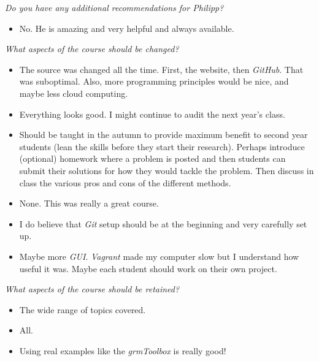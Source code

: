 \begin{boenumerate}
\item \textit{Do you have any additional recommendations for Philipp?}
\begin{itemize}
\item No. He is amazing and very helpful and always available.
\end{itemize}
\item \textit{What aspects of the course should be changed?}
\begin{itemize}
\item The source was changed all the time. First, the website, then \textit{GitHub}. That was suboptimal. Also, more programming principles would be nice, and maybe less cloud computing.
\item Everything looks good. I might continue to audit the next year's class.
\item Should be taught in the autumn to provide maximum benefit to second year students (lean the skills before they start their research). Perhaps introduce (optional) homework where a problem is posted and then students can submit their solutions for how they would tackle the problem. Then discuss in class the various pros and cons of the different methods.
\item None. This was really a great course.
\item I do believe that \textit{Git} setup should be at the beginning and very carefully set up.
\item Maybe more \textit{GUI}. \textit{Vagrant} made my computer slow but I understand how useful it was. Maybe each student should work on their own project.
\end{itemize}
\item \textit{What aspects of the course should be retained?}
\begin{itemize}
\item The wide range of topics covered.
\item All.
\item Using real examples like the \textit{grmToolbox} is really good!
\end{itemize}
\end{boenumerate}

